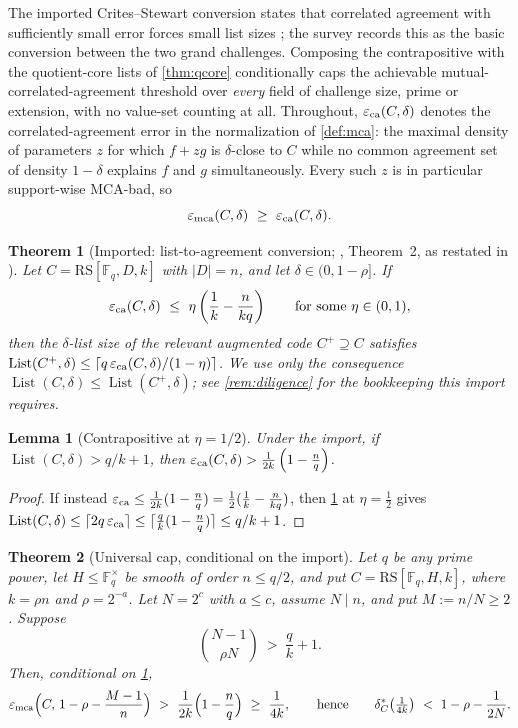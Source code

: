 \documentclass[11pt]{article}
\newtheorem{theorem}{Theorem}[section]
\newtheorem{lemma}[lemma]{Lemma}
\theoremstyle{definition}
\newcommand{\F}{\mathbb F}
\newcommand{\eps}{\varepsilon}
\newcommand{\RS}{\mathrm{RS}}
\newcommand{\emca}{\eps_{\rm mca}}
\newcommand{\eca}{\eps_{\rm ca}}
\newcommand{\Lst}{\operatorname{List}}
\begin{document}
The imported Crites--Stewart conversion states that correlated agreement with sufficiently small error forces small list sizes \cite{CS25}; the survey \cite{ABF26} records this as the basic conversion between the two grand challenges.  Composing the contrapositive with the quotient-core lists of \cref{thm:qcore} conditionally caps the achievable mutual-correlated-agreement threshold over \emph{every} field of challenge size, prime or extension, with no value-set counting at all.  Throughout, $\eca(C,\delta)$ denotes the correlated-agreement error in the normalization of \cref{def:mca}: the maximal density of parameters $z$ for which $f+zg$ is $\delta$-close to $C$ while no common agreement set of density $1-\delta$ explains $f$ and $g$ simultaneously.  Every such $z$ is in particular support-wise MCA-bad, so
\begin{equation}\label{eq:camca}
        \emca(C,\delta)\ \ge\ \eca(C,\delta).
\end{equation}

\begin{theorem}[Imported: list-to-agreement conversion; \cite{CS25}, Theorem~2, as restated in \cite{ABF26}]\label{thm:capimport}
Let $C=\RS[\F_q,D,k]$ with $|D|=n$, and let $\delta\in(0,1-\rho]$.  If
\[
        \eca(C,\delta)\ \le\ \eta\left(\frac1k-\frac n{kq}\right)
        \qquad\text{for some }\eta\in(0,1),
\]
then the $\delta$-list size of the relevant augmented code $C^+\supseteq C$ satisfies $\Lst(C^+,\delta)\le\lceil q\,\eca(C,\delta)/(1-\eta)\rceil$.  We use only the consequence $\Lst(C,\delta)\le\Lst(C^+,\delta)$; see \cref{rem:diligence} for the bookkeeping this import requires.
\end{theorem}

\begin{lemma}[Contrapositive at $\eta=1/2$]\label{lem:capcontra}
Under the import, if $\Lst(C,\delta)>q/k+1$, then $\eca(C,\delta)>\frac1{2k}\left(1-\frac nq\right)$.
\end{lemma}

\begin{proof}
If instead $\eca\le\frac1{2k}(1-\frac nq)=\frac12(\frac1k-\frac n{kq})$, then \cref{thm:capimport} at $\eta=\frac12$ gives $\Lst(C,\delta)\le\lceil 2q\,\eca\rceil\le\lceil\frac qk(1-\frac nq)\rceil\le q/k+1$.
\end{proof}

\begin{theorem}[Universal cap, conditional on the import]\label{thm:cap}
Let $q$ be any prime power, let $H\le\F_q^\times$ be smooth of order $n\le q/2$, and put $C=\RS[\F_q,H,k]$, where $k=\rho n$ and $\rho=2^{-a}$.  Let $N=2^c$ with $a\le c$, assume $N\mid n$, and put $M:=n/N\ge2$.  Suppose
\[
        \binom{N-1}{\rho N}\ >\ \frac qk+1.
\]
Then, conditional on \cref{thm:capimport},
\[
        \emca\Big(C,\,1-\rho-\frac{M-1}n\Big)\ >\ \frac1{2k}\Big(1-\frac nq\Big)\ \ge\ \frac1{4k},
        \qquad\text{hence}\qquad
        \delta^*_C\big(\tfrac1{4k}\big)\ <\ 1-\rho-\frac1{2N}.
\]
\end{theorem}
\end{document}
